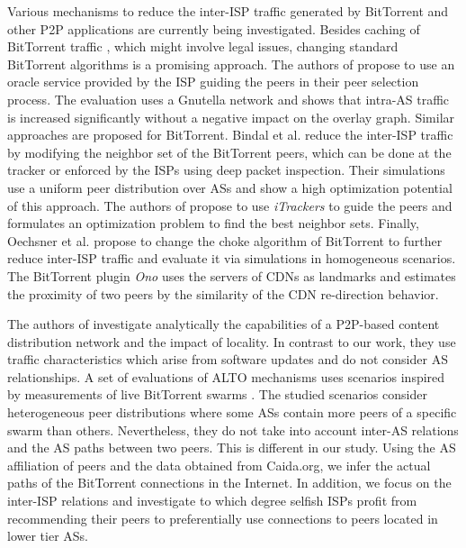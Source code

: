 %
Various mechanisms to reduce the inter-ISP traffic generated by BitTorrent and other P2P applications are currently being investigated. Besides caching of BitTorrent traffic \cite{Lehrieder2010a,Lehrieder2012,Pacifici2012}, which might involve legal issues, changing standard BitTorrent algorithms is a promising approach. The authors of \cite{Aggarwal2007} propose to use an oracle service provided by the ISP guiding the peers in their peer selection process. The evaluation uses a Gnutella network and shows that intra-AS traffic is increased significantly without a negative impact on the overlay graph. Similar approaches are proposed for BitTorrent. Bindal et al. \cite{Bindal2006} reduce the inter-ISP traffic by modifying the neighbor set of the BitTorrent peers, which can be done at the tracker or enforced by the ISPs using deep packet inspection. Their simulations use a uniform peer distribution over ASs and show a high optimization potential of this approach. The authors of \cite{Xie2008} propose to use \emph{iTrackers} to guide the peers and formulates an optimization problem to find the best neighbor sets. Finally, Oechsner et al. \cite{Oechsner2009} propose to change the choke algorithm of BitTorrent to further reduce inter-ISP traffic and evaluate it via simulations in homogeneous scenarios. The BitTorrent plugin \emph{Ono} \cite{Choffnes2008} uses the servers of CDNs as landmarks and estimates the proximity of two peers by the similarity of the CDN re-direction behavior.
%

The authors of \cite{gkantsidis2006planet} investigate analytically the capabilities of a P2P-based content distribution network and the impact of locality. In contrast to our work, they use traffic characteristics which arise from software updates and do not consider AS relationships.
A set of evaluations of ALTO mechanisms uses scenarios inspired by measurements of live BitTorrent swarms \cite{Cuevas2011,Blond2011,Lehrieder2011}. The studied scenarios consider heterogeneous peer distributions where some ASs contain more peers of a specific swarm than others. Nevertheless, they do not take into account inter-AS relations and the AS paths between two peers. This is different in our study. Using the AS affiliation of peers and the data obtained from Caida.org, we infer the actual paths of the BitTorrent connections in the Internet. In addition, we focus on the inter-ISP relations and investigate to which degree selfish ISPs profit from recommending their peers to preferentially use connections to peers located in lower tier ASs.

